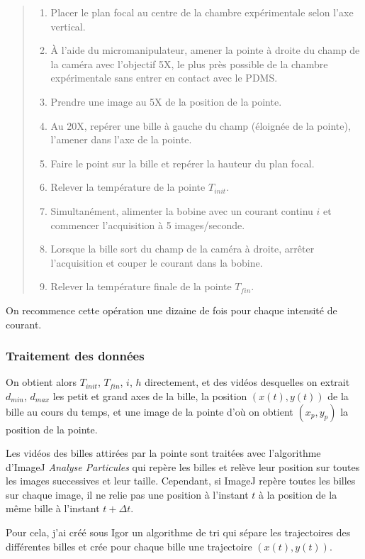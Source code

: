  \begin{quote}
 \begin{enumerate}
 \item Placer le plan focal au centre de la chambre expérimentale selon l'axe vertical.
 \item \`A l'aide du micromanipulateur, amener la pointe à droite du champ de la caméra avec l'objectif 5X, le plus près possible de la chambre expérimentale sans entrer en contact avec le PDMS. 
 \item Prendre une image au 5X de la position de la pointe.
 \item Au 20X, repérer une bille à gauche du champ (éloignée de la pointe), l'amener dans l'axe de la pointe. 
 \item Faire le point sur la bille et repérer la hauteur du plan focal. 
 \item Relever la température de la pointe $T_{init}$.
 \item Simultanément, alimenter la bobine avec un courant continu $i$ et commencer l'acquisition à 5 images/seconde. 
 \item Lorsque la bille sort du champ de la caméra à droite, arrêter l'acquisition et couper le courant dans la bobine.
 \item Relever la température finale de la pointe $T_{fin}$.
 \end{enumerate}
 \end{quote}
 
 On recommence cette opération une dizaine de fois pour chaque intensité de courant. 
 
 \subsubsection{Traitement des données}
 On obtient alors $T_{init}$, $T_{fin}$, $i$, $h$ directement, et des vidéos desquelles on extrait $d_{min}$, $d_{max}$ les petit et grand axes de la bille, la position $(x(t),y(t))$ de la bille au cours du temps, et une image de la pointe d'où on obtient $(x_p,y_p)$ la position de la pointe. 
 
 Les vidéos des billes attirées par la pointe sont traitées avec l'algorithme d'ImageJ \emph{Analyse Particules} qui repère les billes et relève leur position sur toutes les images successives et leur taille. 
 Cependant, si ImageJ repère toutes les billes sur chaque image, il ne relie pas une position à l'instant $t$ à la position de la même bille à l'instant $t+ \Delta t$. 
 
 Pour cela, j'ai créé sous Igor un algorithme de tri qui sépare les trajectoires des différentes billes et crée pour chaque bille une trajectoire $(x(t),y(t))$. 
 
